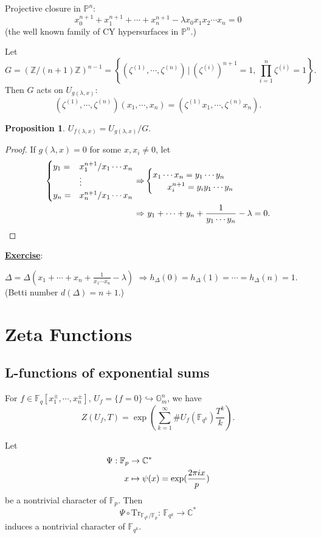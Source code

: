 \documentclass[a4paper,oneside,11pt]{article}
\theoremstyle{plain} \theoremstyle{definition}
\newtheorem{Prop}[Thm]{Proposition}
\theoremstyle{remark}
\newenvironment{pf}{ \begin{proof} }{ \end{proof} }
\newcommand{\Z}{\mathbb{Z}}
\newcommand{\C}{\mathbb{C}}
\newcommand{\f}{\mathbb{F}}
\begin{document}
Projective closure in $\mathbb{P}^n$:
$$x_0^{n+1}+ x_1^{n+1}+\cdots+x_n^{n+1}-\lambda x_0x_1x_2\cdots x_n=0$$
(the well known family of CY hypersurfaces in $\mathbb{P}^n$.)

\vskip 1cm Let
$$G=\left(\Z/(n+1)\Z\right)^{n-1}=\left\{(\zeta^{(1)},\cdots,\zeta^{(n)})
\,\Big|\,(\zeta^{(i)})^{n+1}=1,\, \prod_{i=1}^n \zeta^{(i)}=1
\right\}.$$ Then $G$ acts on $U_{g(\lambda,x)}$:
$$(\zeta^{(1)},\cdots,\zeta^{(n)})(x_1,\cdots,x_n)=
(\zeta^{(1)}x_1,\cdots,\zeta^{(n)}x_n).$$

\begin{Prop} $U_{f(\lambda,x)}=U_{g(\lambda,x)}/G$.
\end{Prop}
\begin{pf} If $g(\lambda,x)=0$ for some $x, x_i\ne 0$, let
$$\aligned \begin{cases} y_1=&x_1^{n+1}/x_1\cdots x_n\\ &\vdots\\
y_n=&x_n^{n+1}/x_1\cdots
x_n\end{cases}\Rightarrow&\begin{cases}  x_1\cdots x_n=y_1\cdots y_n\\
 \hskip 6mm x_i^{n+1}=y_iy_1\cdots y_n\end{cases}\\ \Rightarrow&\
 y_1+\cdots +y_n+\frac{1}{y_1\cdots y_n}-\lambda=0.\endaligned$$\end{pf}

 \underline{\bf Exercise}:

 $\Delta=\Delta(x_1+\cdots+x_n+\frac{1}{x_1\cdots x_n}-\lambda)$
$\Rightarrow h_\Delta(0)=h_\Delta(1)=\cdots= h_\Delta(n)=1$.
 (Betti number $d(\Delta)=n+1$.)

 \section{Zeta Functions}

\subsection{L-functions of exponential sums}

 For $f\in \f_q[x_1^{\pm},\cdots,x_n^{\pm}]$,
 $U_f=\{f=0\}\hookrightarrow \mathbb{G}_m^n$, we have
 $$Z(U_f,T)=\exp(\sum_{k=1}^\infty \#U_f(\f_{q^k})
 \frac{T^k}{k}).$$

 Let $$\aligned \Psi: \f_p&\rightarrow\C^*\\ x&\mapsto\psi(x)=
 \exp(\frac{2\pi ix}{p})\endaligned$$
 be a nontrivial character of $\f_p$. Then $$\Psi\circ
 \text{Tr}_{\f_{q^k}/{\f_p}}:\, \f_{q^k}\rightarrow\C^*$$ induces a
 nontrivial character of $\f_{q^k}$.
\end{document}
